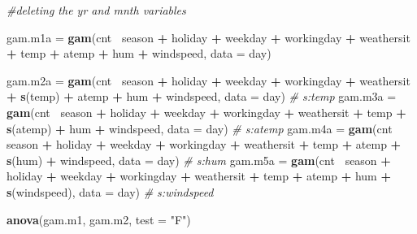 \documentclass[]{article}
\newenvironment{Shaded}{\begin{snugshade}}{\end{snugshade}}
\newcommand{\KeywordTok}[1]{\textcolor[rgb]{0.13,0.29,0.53}{\textbf{#1}}}
\newcommand{\DataTypeTok}[1]{\textcolor[rgb]{0.13,0.29,0.53}{#1}}
\newcommand{\StringTok}[1]{\textcolor[rgb]{0.31,0.60,0.02}{#1}}
\newcommand{\CommentTok}[1]{\textcolor[rgb]{0.56,0.35,0.01}{\textit{#1}}}
\newcommand{\OperatorTok}[1]{\textcolor[rgb]{0.81,0.36,0.00}{\textbf{#1}}}
\newcommand{\NormalTok}[1]{#1}
\begin{document}
\begin{Shaded}
\begin{Highlighting}[]
\CommentTok{#deleting the yr and mnth variables}

\NormalTok{gam.m1a =}\StringTok{ }\KeywordTok{gam}\NormalTok{(cnt}\OperatorTok{~}\StringTok{ }\NormalTok{season }\OperatorTok{+}\StringTok{  }\NormalTok{holiday }\OperatorTok{+}\StringTok{ }\NormalTok{weekday }\OperatorTok{+}\StringTok{ }\NormalTok{workingday }\OperatorTok{+}\StringTok{ }\NormalTok{weathersit }\OperatorTok{+}\StringTok{ }\NormalTok{temp }\OperatorTok{+}\StringTok{ }\NormalTok{atemp }\OperatorTok{+}\StringTok{ }\NormalTok{hum }\OperatorTok{+}\StringTok{ }\NormalTok{windspeed, }\DataTypeTok{data =}\NormalTok{ day)}


\NormalTok{gam.m2a =}\StringTok{ }\KeywordTok{gam}\NormalTok{(cnt}\OperatorTok{~}\StringTok{ }\NormalTok{season }\OperatorTok{+}\StringTok{  }\NormalTok{holiday }\OperatorTok{+}\StringTok{ }\NormalTok{weekday }\OperatorTok{+}\StringTok{ }\NormalTok{workingday }\OperatorTok{+}\StringTok{ }\NormalTok{weathersit }\OperatorTok{+}\StringTok{ }\KeywordTok{s}\NormalTok{(temp) }\OperatorTok{+}\StringTok{ }\NormalTok{atemp }\OperatorTok{+}\StringTok{ }\NormalTok{hum }\OperatorTok{+}\StringTok{ }\NormalTok{windspeed, }\DataTypeTok{data =}\NormalTok{ day) }\CommentTok{# s:temp}
\NormalTok{gam.m3a =}\StringTok{ }\KeywordTok{gam}\NormalTok{(cnt}\OperatorTok{~}\StringTok{ }\NormalTok{season }\OperatorTok{+}\StringTok{  }\NormalTok{holiday }\OperatorTok{+}\StringTok{ }\NormalTok{weekday }\OperatorTok{+}\StringTok{ }\NormalTok{workingday }\OperatorTok{+}\StringTok{ }\NormalTok{weathersit }\OperatorTok{+}\StringTok{ }\NormalTok{temp }\OperatorTok{+}\StringTok{ }\KeywordTok{s}\NormalTok{(atemp) }\OperatorTok{+}\StringTok{ }\NormalTok{hum }\OperatorTok{+}\StringTok{ }\NormalTok{windspeed, }\DataTypeTok{data =}\NormalTok{ day) }\CommentTok{# s:atemp}
\NormalTok{gam.m4a =}\StringTok{ }\KeywordTok{gam}\NormalTok{(cnt}\OperatorTok{~}\StringTok{ }\NormalTok{season }\OperatorTok{+}\StringTok{  }\NormalTok{holiday }\OperatorTok{+}\StringTok{ }\NormalTok{weekday }\OperatorTok{+}\StringTok{ }\NormalTok{workingday }\OperatorTok{+}\StringTok{ }\NormalTok{weathersit }\OperatorTok{+}\StringTok{ }\NormalTok{temp }\OperatorTok{+}\StringTok{ }\NormalTok{atemp }\OperatorTok{+}\StringTok{ }\KeywordTok{s}\NormalTok{(hum) }\OperatorTok{+}\StringTok{ }\NormalTok{windspeed, }\DataTypeTok{data =}\NormalTok{ day) }\CommentTok{# s:hum}
\NormalTok{gam.m5a =}\StringTok{ }\KeywordTok{gam}\NormalTok{(cnt}\OperatorTok{~}\StringTok{ }\NormalTok{season }\OperatorTok{+}\StringTok{  }\NormalTok{holiday }\OperatorTok{+}\StringTok{ }\NormalTok{weekday }\OperatorTok{+}\StringTok{ }\NormalTok{workingday }\OperatorTok{+}\StringTok{ }\NormalTok{weathersit }\OperatorTok{+}\StringTok{ }\NormalTok{temp }\OperatorTok{+}\StringTok{ }\NormalTok{atemp }\OperatorTok{+}\StringTok{ }\NormalTok{hum }\OperatorTok{+}\StringTok{ }\KeywordTok{s}\NormalTok{(windspeed), }\DataTypeTok{data =}\NormalTok{ day) }\CommentTok{# s:windspeed}

\KeywordTok{anova}\NormalTok{(gam.m1, gam.m2, }\DataTypeTok{test =} \StringTok{"F"}\NormalTok{)}
\end{Highlighting}
\end{Shaded}
\end{document}
